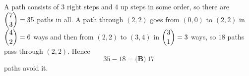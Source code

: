 A path consists of $3$ right steps and $4$ up steps in some order, so there are $\dbinom73=35$ paths in all. A path through $(2,2)$ goes from $(0,0)$ to $(2,2)$ in $\dbinom42=6$ ways and then from $(2,2)$ to $(3,4)$ in $\dbinom31=3$ ways, so $18$ paths pass through $(2,2)$. Hence
\[
35-18=\boxed{\textbf{(B)}\ 17}
\]
paths avoid it.
